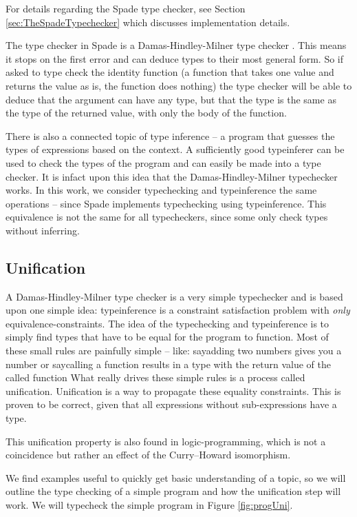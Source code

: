 For details regarding the Spade type checker, see Section \ref{sec:TheSpadeTypechecker} which discusses implementation details.

The type checker in Spade is a Damas-Hindley-Milner type checker \cite{src:DamasHindleyMilner}. This means it stops on the first error and can deduce types to their most general form. So if asked to type check the identity function (a function that takes one value and returns the value as is, the function does nothing) the type checker will be able to deduce that the argument can have any type, but that the type is the same as the type of the returned value, with only the body of the function.\cite{src:DamasHindleyMilner}

There is also a connected topic of type inference -- a program that guesses the types of expressions based on the context. A sufficiently good typeinferer can be used to check the types of the program and can easily be made into a type checker. It is infact upon this idea that the Damas-Hindley-Milner typechecker works. In this work, we consider typechecking and typeinference the same operations -- since Spade implements typechecking using typeinference. This equivalence is not the same for all typecheckers, since some only check types without inferring.

\subsection{Unification}
\label{sec:Unification}
A Damas-Hindley-Milner type checker is a very simple typechecker and is based upon one simple idea: typeinference is a constraint satisfaction problem with \textit{only} equivalence-constraints. The idea of the typechecking and typeinference is to simply find types that have to be equal for the program to function. Most of these small rules are painfully simple -- like: say{adding two numbers gives you a number} or say{calling a function results in a type with the return value of the called function} What really drives these simple rules is a process called unification. Unification is a way to propagate these equality constraints. This is proven to be correct, given that all expressions without sub-expressions have a type.

This unification property is also found in logic-programming, which is not a coincidence but rather an effect of the Curry–Howard isomorphism. \cite{src:curryHowardIso}

We find examples useful to quickly get basic understanding of a topic, so we will outline the type checking of a simple program and how the unification step will work. We will typecheck the simple program in Figure \ref{fig:progUni}.

